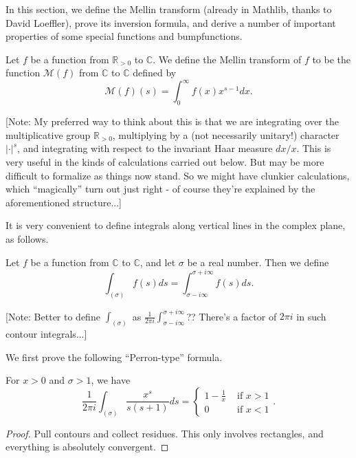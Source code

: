 
In this section, we define the Mellin transform (already in Mathlib, thanks to David Loeffler), prove its inversion formula, and
derive a number of important properties of some special functions and bumpfunctions.

\begin{definition}\label{MellinTransform}
Let $f$ be a function from $\mathbb{R}_{>0}$ to $\mathbb{C}$. We define the Mellin transform of $f$ to be the function $\mathcal{M}(f)$ from $\mathbb{C}$ to $\mathbb{C}$ defined by
$$\mathcal{M}(f)(s) = \int_0^\infty f(x)x^{s-1}dx.$$
\end{definition}

[Note: My preferred way to think about this is that we are integrating over the multiplicative group $\mathbb{R}_{>0}$, multiplying by a (not necessarily unitary!) character $|\cdot|^s$, and integrating with respect to the invariant Haar measure $dx/x$. This is very useful in the kinds of calculations carried out below. But may be more difficult to formalize as things now stand. So we
might have clunkier calculations, which ``magically'' turn out just right - of course they're explained by the aforementioned structure...]




It is very convenient to define integrals along vertical lines in the complex plane, as follows.
\begin{definition}\label{VerticalIntegral}
Let $f$ be a function from $\mathbb{C}$ to $\mathbb{C}$, and let $\sigma$ be a real number. Then we define
$$\int_{(\sigma)}f(s)ds = \int_{\sigma-i\infty}^{\sigma+i\infty}f(s)ds.$$
\end{definition}
[Note: Better to define $\int_{(\sigma)}$ as $\frac1{2\pi i}\int_{\sigma-i\infty}^{\sigma+i\infty}$??
There's a factor of $2\pi i$ in such contour integrals...]



We first prove the following ``Perron-type'' formula.
\begin{lemma}\label{PerronFormula}
For $x>0$ and $\sigma>1$, we have
$$
\frac1{2\pi i}
\int_{(\sigma)}\frac{x^s}{s(s+1)}ds = \begin{cases}
1-\frac1x & \text{ if }x>1\\
0 & \text{ if } x<1
\end{cases}.
$$
\end{lemma}



\begin{proof}
Pull contours and collect residues. This only involves rectangles, and everything is absolutely convergent.
\end{proof}



